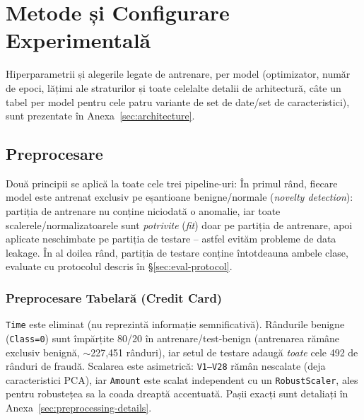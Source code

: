 \chapter{Metode și Configurare Experimentală}
\label{ch:methodology}


Hiperparametrii și alegerile legate de antrenare, per model (optimizator, număr de epoci, lățimi ale straturilor și toate celelalte detalii de arhitectură, câte un tabel per model pentru cele patru variante de set de date/set de caracteristici), sunt prezentate în Anexa~\ref{sec:architecture}.

\section{Preprocesare}
\label{sec:preprocessing}

Două principii se aplică la toate cele trei pipeline-uri:
În primul rând, fiecare model este antrenat exclusiv pe eșantioane benigne/normale (\emph{novelty detection}):
partiția de antrenare nu conține niciodată o anomalie, iar toate scalerele/normalizatoarele sunt \emph{potrivite} (\emph{fit}) doar pe partiția de antrenare, apoi aplicate neschimbate pe partiția de testare -- astfel evităm probleme de data leakage.
În al doilea rând, partiția de testare conține întotdeauna ambele clase, evaluate cu protocolul descris în \S\ref{sec:eval-protocol}.

\subsection{Preprocesare Tabelară (Credit Card)}

\texttt{Time} este eliminat (nu reprezintă informație semnificativă). Rândurile benigne (\texttt{Class=0}) sunt împărțite 80/20 în antrenare/test-benign (antrenarea rămâne exclusiv benignă, $\sim$227{,}451 rânduri), iar setul de testare adaugă \emph{toate} cele 492 de rânduri de fraudă. Scalarea este asimetrică: \texttt{V1--V28} rămân nescalate (deja caracteristici PCA), iar \texttt{Amount} este scalat independent cu un \texttt{RobustScaler}, ales pentru robustețea sa la coada dreaptă accentuată. Pașii exacți sunt detaliați în Anexa~\ref{sec:preprocessing-details}.

